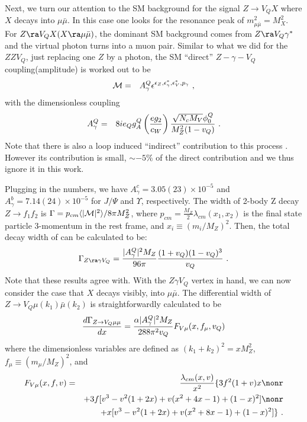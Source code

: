 \documentclass[11pt]{article}
\begin{document}
 Next, we turn our attention to the SM background for the signal $Z\to V_Q X$ where $X$ decays into $\mu\bar{\mu}$. In this case one looks for the resonance peak of $m^2_{\mu\bar{\mu}}=M_X^2$.
 For $Z\ra V_Q X (X\ra\mu\bar{\mu})$, the dominant SM background comes from $Z\ra V_Q \gamma^*$  and the virtual photon turns into a muon pair.
Similar to what we did for the $ZZV_Q$, just replacing one $Z$ by a photon, the SM ``direct'' $Z-\gamma-V_Q$ coupling(amplitude) is worked out to be
\begin{eqnarray}
{\cal M}&=& A^Q_\gamma  \epsilon^{ \epsilon_Z, \epsilon_\gamma^*, \epsilon_V^*,  p_\gamma}\ , \end{eqnarray}
 with the dimensionless coupling
\begin{eqnarray}
 A^Q_\gamma &=& 8 i e_Q g^Q_A  \left(\frac{e g_2}{c_W}\right) {\sqrt{N_c M_V} \phi_0^Q \over M_Z^2(1-v_Q)}\  .
\end{eqnarray}
 Note that there is also a loop induced ``indirect'' contribution to this process \cite{Huang:2014cxa,Bodwin:2017pzj}. However its contribution is small, $\sim -5\%$ of the direct contribution and we thus ignore it in this work.

Plugging in the numbers, we have  $A_\gamma^c= 3.05(23)\times10^{-5}$ and $A_\gamma^b= 7.14(24)\times 10^{-5}$ for  $J/\Psi$ and $\Upsilon$, respectively.
The width of 2-body Z decay $Z\to f_1 f_2$ is $\Gamma = p_{cm} \langle|{\cal M}|^2\rangle/ 8\pi M_Z^2$,
where $p_{cm}=\frac{M_Z}{2} \lambda_{cm}(x_1,x_2)$ is the final state particle 3-momentum in the rest frame, and $x_i\equiv (m_i/M_Z)^2$.
Then, the total decay width of can be calculated to be:
\begin{equation}
\Gamma _{Z\ra \gamma V_{Q}}= {|A^Q_\gamma|^2 M_Z \over 96\pi  }{ (1+v_Q )(1-v_Q)^3 \over v_Q}\  .
\end{equation}
Note that these results agree with\cite{Guberina:1980dc}.
With the $Z\gamma V_Q$ vertex in hand, we can now consider the case that $X$ decays visibly, into $\mu\bar{\mu}$.
The differential width of $Z\to V_Q \mu(k_1) \bar{\mu}(k_2)$ is  straightforwardly calculated to be
\begin{equation}
\frac{d \Gamma_{Z\to V_Q \mu\mu}}{d x}={\alpha |A_\gamma^Q|^2 M_Z \over 288 \pi^2 v_Q}F_{V\mu}(x,f_\mu,v_Q)
\end{equation}
where the dimensionless variables are defined as $(k_1+k_2)^2=x M_Z^2$, $f_\mu \equiv (m_\mu/M_Z)^2$, and
\begin{eqnarray}
F_{V\mu}(x,f,v)&=& {\lambda_{cm}(x,v)\over x^2 }\{
3f^2(1+v)x \nonr \\
&&+3f[v^3-v^2(1+2x)+v(x^2+4x-1)+(1-x)^2]\nonr\\
&& + x[v^3-v^2(1+2x)+v(x^2+8x-1)+(1-x)^2] \}\ .
\end{eqnarray}
\end{document}
